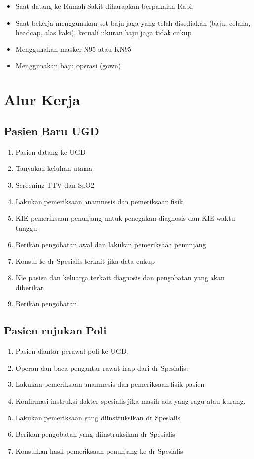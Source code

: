 \documentclass[
]{book}
\providecommand{\tightlist}{%
  \setlength{\itemsep}{0pt}\setlength{\parskip}{0pt}}
\begin{document}
\begin{itemize}
\tightlist
\item
  Saat datang ke Rumah Sakit diharapkan berpakaian Rapi.
\item
  Saat bekerja menggunakan set baju jaga yang telah disediakan (baju, celana, headcap, alas kaki), kecuali ukuran baju jaga tidak cukup
\item
  Menggunakan masker N95 atau KN95
\item
  Menggunakan baju operasi (gown)
\end{itemize}

\hypertarget{cross}{%
\chapter{Alur Kerja}\label{cross}}

\hypertarget{pasien-baru-ugd}{%
\section{Pasien Baru UGD}\label{pasien-baru-ugd}}

\begin{enumerate}
\def\labelenumi{\arabic{enumi}.}
\tightlist
\item
  Pasien datang ke UGD
\item
  Tanyakan keluhan utama
\item
  Screening TTV dan SpO2
\item
  Lakukan pemeriksaan anamnesis dan pemeriksaan fisik
\item
  KIE pemeriksaan penunjang untuk penegakan diagnosis dan KIE waktu tunggu
\item
  Berikan pengobatan awal dan lakukan pemeriksaan penunjang
\item
  Konsul ke dr Spesialis terkait jika data cukup
\item
  Kie pasien dan keluarga terkait diagnosis dan pengobatan yang akan diberikan
\item
  Berikan pengobatan.
\end{enumerate}

\hypertarget{pasien-rujukan-poli}{%
\section{Pasien rujukan Poli}\label{pasien-rujukan-poli}}

\begin{enumerate}
\def\labelenumi{\arabic{enumi}.}
\tightlist
\item
  Pasien diantar perawat poli ke UGD.
\item
  Operan dan baca pengantar rawat inap dari dr Spesialis.
\item
  Lakukan pemeriksaan anamnesis dan pemeriksaan fisik pasien
\item
  Konfirmasi instruksi dokter spesialis jika masih ada yang ragu atau kurang.
\item
  Lakukan pemeriksaan yang diinstruksikan dr Spesialis
\item
  Berikan pengobatan yang diinstruksikan dr Spesialis
\item
  Konsulkan hasil pemeriksaan penunjang ke dr Spesialis
\end{enumerate}
\end{document}
